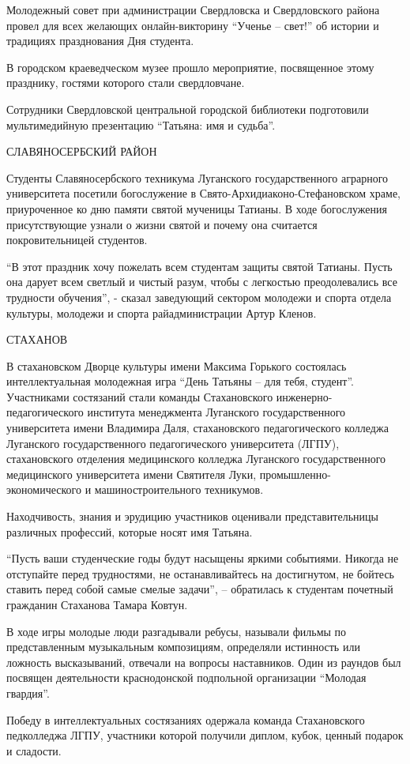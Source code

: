 Молодежный совет при администрации Свердловска и Свердловского района провел
для всех желающих онлайн-викторину \enquote{Ученье – свет!} об истории и традициях
празднования Дня студента.


В городском краеведческом музее прошло мероприятие, посвященное этому
празднику, гостями которого стали свердловчане.  

Сотрудники Свердловской центральной городской библиотеки подготовили
мультимедийную презентацию \enquote{Татьяна: имя и судьба}.

СЛАВЯНОСЕРБСКИЙ РАЙОН

Студенты Славяносербского техникума Луганского государственного аграрного
университета посетили богослужение в Свято-Архидиаконо-Стефановском храме,
приуроченное ко дню памяти святой мученицы Татианы. В ходе богослужения
присутствующие узнали о жизни святой и почему она считается покровительницей
студентов.

\enquote{В этот праздник хочу пожелать всем студентам защиты святой Татианы. Пусть она
дарует всем светлый и чистый разум, чтобы с легкостью преодолевались все
трудности обучения}, - сказал заведующий сектором молодежи и спорта отдела
культуры, молодежи и спорта райадминистрации Артур Кленов. 

СТАХАНОВ

В стахановском Дворце культуры имени Максима Горького состоялась
интеллектуальная молодежная игра \enquote{День Татьяны – для тебя, студент}.
Участниками состязаний стали команды Стахановского инженерно-педагогического
института менеджмента Луганского государственного университета имени Владимира
Даля, стахановского педагогического колледжа Луганского государственного
педагогического университета (ЛГПУ), стахановского отделения медицинского
колледжа Луганского государственного медицинского университета имени Святителя
Луки, промышленно-экономического и машиностроительного техникумов.

Находчивость, знания и эрудицию участников оценивали представительницы
различных профессий, которые носят имя Татьяна.

\enquote{Пусть ваши студенческие годы будут насыщены яркими событиями. Никогда не
отступайте перед трудностями, не останавливайтесь на достигнутом, не бойтесь
ставить перед собой самые смелые задачи}, – обратилась к студентам почетный
гражданин Стаханова Тамара Ковтун.

В ходе игры молодые люди разгадывали ребусы, называли фильмы по представленным
музыкальным композициям, определяли истинность или ложность высказываний,
отвечали на вопросы наставников. Один из раундов был посвящен деятельности
краснодонской подпольной организации \enquote{Молодая гвардия}.

Победу в интеллектуальных состязаниях одержала команда Стахановского
педколледжа ЛГПУ, участники которой получили диплом, кубок, ценный подарок и
сладости.
